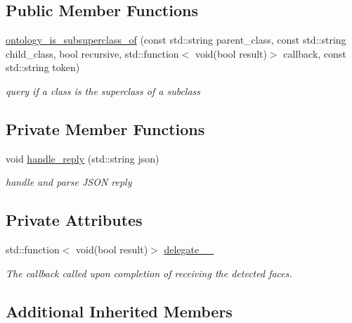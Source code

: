 \subsection*{Public Member Functions}
\begin{DoxyCompactItemize}
\item 
\hyperlink{classrapp_1_1cloud_1_1ontology__is__subsuperclass__of_ab47981d0d5995e40c18684a8e96ad976}{ontology\-\_\-is\-\_\-subsuperclass\-\_\-of} (const std\-::string parent\-\_\-class, const std\-::string child\-\_\-class, bool recursive, std\-::function$<$ void(bool result)$>$ callback, const std\-::string token)
\begin{DoxyCompactList}\small\item\em query if a class is the superclass of a subclass \end{DoxyCompactList}\end{DoxyCompactItemize}
\subsection*{Private Member Functions}
\begin{DoxyCompactItemize}
\item 
void \hyperlink{classrapp_1_1cloud_1_1ontology__is__subsuperclass__of_aabe3f5a2ba17af93c86158759046888b}{handle\-\_\-reply} (std\-::string json)
\begin{DoxyCompactList}\small\item\em handle and parse J\-S\-O\-N reply \end{DoxyCompactList}\end{DoxyCompactItemize}
\subsection*{Private Attributes}
\begin{DoxyCompactItemize}
\item 
std\-::function$<$ void(bool result)$>$ \hyperlink{classrapp_1_1cloud_1_1ontology__is__subsuperclass__of_a43a9210f6b949ae2042a25627e9fcff5}{delegate\-\_\-\-\_\-}
\begin{DoxyCompactList}\small\item\em The callback called upon completion of receiving the detected faces. \end{DoxyCompactList}\end{DoxyCompactItemize}
\subsection*{Additional Inherited Members}


